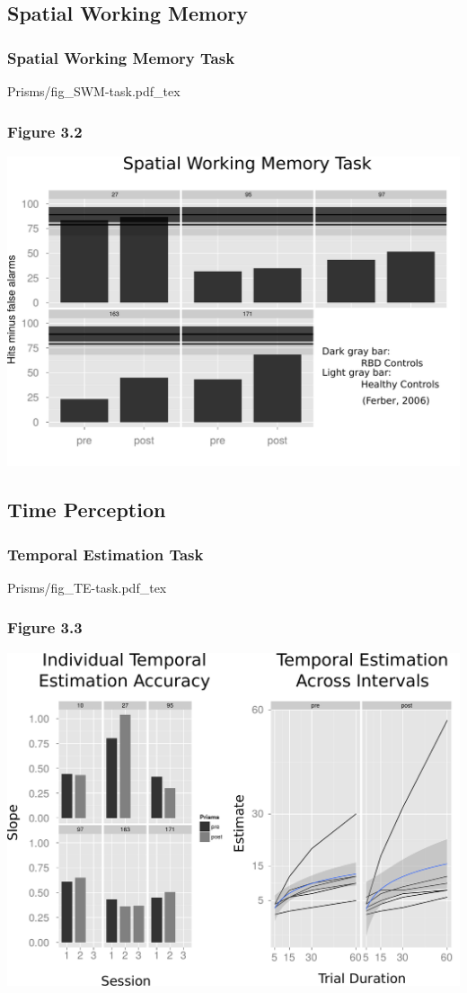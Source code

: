 \documentclass{beamer}
\begin{document}
\subsection*{Spatial Working Memory}

\begin{frame}
	\frametitle{Spatial Working Memory Task}
	\def\svgwidth{0.7\textwidth}
	{Prisms/fig_SWM-task.pdf_tex}
\end{frame}



\subsection*{Time Perception}
\begin{frame}
	\frametitle{Temporal Estimation Task}
	\def\svgwidth{0.9\textwidth}
	{Prisms/fig_TE-task.pdf_tex}
\end{frame}

\end{document}
